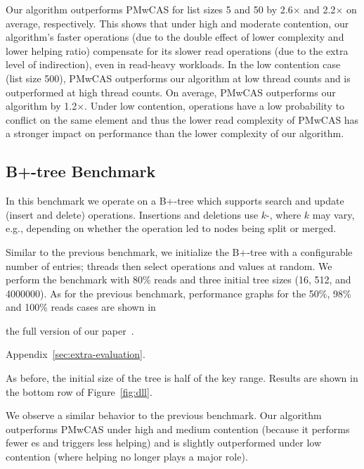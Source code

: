 Our algorithm outperforms PMwCAS for list sizes 5 and 50 by 2.6$\times$ and 2.2$\times$ on average, respectively. 
This shows that under high and moderate contention, our algorithm's faster \mcas{} operations (due to the double effect of lower complexity and lower helping ratio) compensate for its slower read operations (due to the extra level of indirection), even in read-heavy workloads. In the low contention case (list size 500), PMwCAS outperforms our algorithm at low thread counts and is outperformed at high thread counts. On average, PMwCAS outperforms our algorithm by 1.2$\times$. Under low contention, operations have a low probability to conflict on the same element and thus the lower read complexity of PMwCAS has a stronger impact on performance than the lower \mcas{} complexity of our algorithm.



\subsection{B+-tree Benchmark}
In this benchmark we operate on a B+-tree which supports search and update (insert and delete) operations. Insertions and deletions use $k$-\cas{}, where $k$ may vary, e.g., depending on whether the operation led to nodes being split or merged.

Similar to the previous benchmark, we initialize the B+-tree with a configurable number of entries; threads then select operations and values at random. We perform the benchmark with 80\% reads and three initial tree sizes (16, 512, and 4000000). As for the previous benchmark, performance graphs for the 50\%, 98\% and 100\% reads cases are shown in
\begin{camera}
the full version of our paper~\cite{longversion}.
\end{camera}\begin{arxiv}
Appendix~\ref{sec:extra-evaluation}.
\end{arxiv} 
As before, the initial size of the tree is half of the key range. Results are shown in the bottom row of Figure~\ref{fig:dll}.

We observe a similar behavior to the previous benchmark. Our algorithm outperforms PMwCAS under high and medium contention (because it performs fewer \cas{}es and triggers less helping) and is slightly outperformed under low contention (where helping no longer plays a major role). 